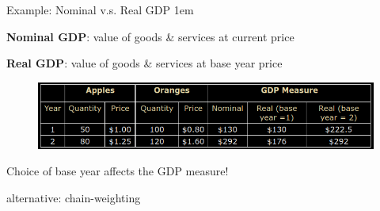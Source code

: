 \documentclass[11pt,aspectratio=43]{beamer}
\let\olditemize=\itemize
\let\endolditemize=\enditemize
\renewenvironment{itemize}{\olditemize \itemsep1em}{\endolditemize}
\theoremstyle{definition}
\begin{document}
\begin{frame}{Example: Nominal v.s. Real GDP}
\label{slide:Example__Nominal_v_s__Real_GDP}
    \begin{itemize}
        \item \textbf{Nominal GDP}: value of goods \& services at current price
        \item \textbf{Real GDP}: value of goods \& services at base year price
    \end{itemize}
    \begin{figure}
        \includegraphics[width=\textwidth]{./figures/GDPMeasurement.png}
    \end{figure}

    Choice of base year affects the GDP measure!

    alternative: chain-weighting

\end{frame}
\end{document}
